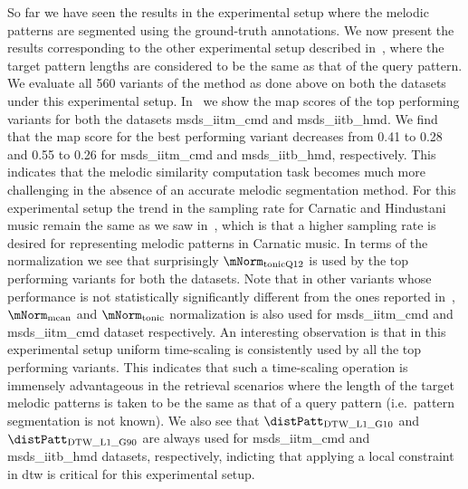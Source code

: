 So far we have seen the results in the experimental setup where the melodic patterns are segmented using the ground-truth annotations. We now present the results corresponding to the other experimental setup described in~, where the target pattern lengths are considered to be the same as that of the query pattern. We evaluate all 560 variants of the method as done above on both the datasets under this experimental setup. In~ we show the \gls{map} scores of the top performing variants for both the datasets \acrshort{msds_iitm_cmd} and \acrshort{msds_iitb_hmd}. We find that the \gls{map} score for the best performing variant decreases from 0.41 to 0.28 and 0.55 to 0.26 for \acrshort{msds_iitm_cmd} and \acrshort{msds_iitb_hmd}, respectively. This indicates that the melodic similarity computation task becomes much more challenging in the absence of an accurate melodic segmentation method. For this experimental setup the trend in the sampling rate for Carnatic and Hindustani music remain the same as we saw in~, which is that a higher sampling rate is desired for representing melodic patterns in Carnatic music. In terms of the normalization we see that surprisingly $\mNorm_{\mathrm{tonicQ12}}$ is used by the top performing variants for both the datasets. Note that in other variants whose performance is not statistically significantly different from the ones reported in~, $\mNorm_{\mathrm{mean}}$ and $\mNorm_{\mathrm{tonic}}$ normalization is also used for \acrshort{msds_iitm_cmd} and \acrshort{msds_iitm_cmd} dataset respectively. An interesting observation is that in this experimental setup uniform time-scaling is consistently used by all the top performing variants. This indicates that such a time-scaling operation is immensely advantageous in the retrieval scenarios where the length of the target melodic patterns is taken to be the same as that of a query pattern (i.e.~pattern segmentation is not known). We also see that $\distPatt_{\mathrm{DTW\_L1\_G10}}$ and $\distPatt_{\mathrm{DTW\_L1\_G90}}$ are always used for \acrshort{msds_iitm_cmd} and \acrshort{msds_iitb_hmd} datasets, respectively, indicting that applying a local constraint in \gls{dtw} is critical for this experimental setup.


